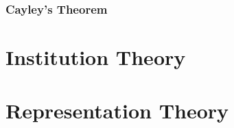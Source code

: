 \subsubsection{Cayley's Theorem}\label{subsec:cayleys_theorem}



\section{Institution Theory}\label{subsec:institution_theory}

\section{Representation Theory}
